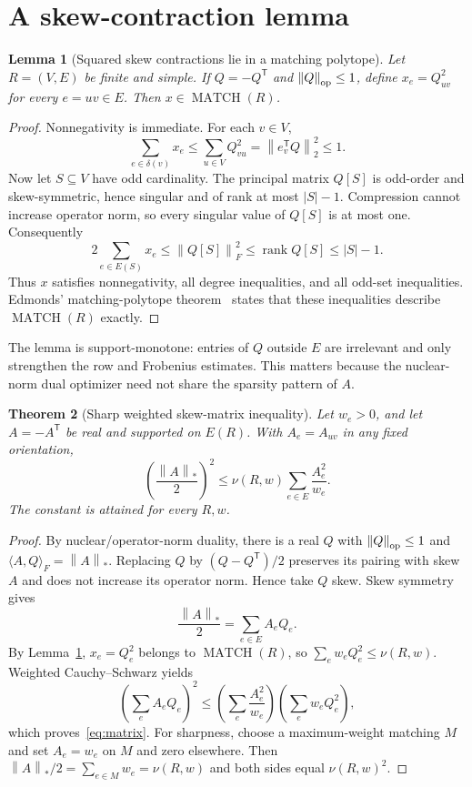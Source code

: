 \documentclass[11pt,a4paper]{article}
\newtheorem{theorem}{Theorem}[section]
\newtheorem{lemma}[theorem]{Lemma}
\theoremstyle{remark}
\newcommand{\norm}[1]{\left\lVert#1\right\rVert}
\newcommand{\MATCH}{\operatorname{MATCH}}
\begin{document}
\section{A skew-contraction lemma}

\begin{lemma}[Squared skew contractions lie in a matching polytope]
\label{lem:contraction}
Let $R=(V,E)$ be finite and simple. If $Q=-Q^{\mathsf T}$ and
$\norm{Q}_{\rm op}\leq1$, define $x_e=Q_{uv}^2$ for every $e=uv\in E$.
Then $x\in\MATCH(R)$.
\end{lemma}

\begin{proof}
Nonnegativity is immediate. For each $v\in V$,
\[
 \sum_{e\in\delta(v)}x_e
 \leq\sum_{u\in V}Q_{vu}^2
 =\norm{e_v^{\mathsf T}Q}_2^2\leq1.
\]
Now let $S\subseteq V$ have odd cardinality. The principal matrix $Q[S]$
is odd-order and skew-symmetric, hence singular and of rank at most $|S|-1$.
Compression cannot increase operator norm, so every singular value of $Q[S]$
is at most one. Consequently
\[
 2\sum_{e\in E(S)}x_e
 \leq \norm{Q[S]}_F^2
 \leq \operatorname{rank}Q[S]\leq |S|-1.
\]
Thus $x$ satisfies nonnegativity, all degree inequalities, and all odd-set
inequalities. Edmonds' matching-polytope theorem~\cite{edmonds} states that
these inequalities describe $\MATCH(R)$ exactly.
\end{proof}

The lemma is support-monotone: entries of $Q$ outside $E$ are irrelevant and
only strengthen the row and Frobenius estimates. This matters because the
nuclear-norm dual optimizer need not share the sparsity pattern of $A$.

\begin{theorem}[Sharp weighted skew-matrix inequality]
\label{thm:matrix}
Let $w_e>0$, and let $A=-A^{\mathsf T}$ be real and supported on $E(R)$.
With $A_e=A_{uv}$ in any fixed orientation,
\begin{equation}\label{eq:matrix}
 \left(\frac{\norm{A}_*}{2}\right)^2
 \leq \nu(R,w)\sum_{e\in E}\frac{A_e^2}{w_e}.
\end{equation}
The constant is attained for every $R,w$.
\end{theorem}

\begin{proof}
By nuclear/operator-norm duality, there is a real $Q$ with
$\norm{Q}_{\rm op}\leq1$ and
$\langle A,Q\rangle_F=\norm{A}_*$. Replacing $Q$ by
$(Q-Q^{\mathsf T})/2$ preserves its pairing with skew $A$ and does not
increase its operator norm. Hence take $Q$ skew. Skew symmetry gives
\[
 \frac{\norm{A}_*}{2}=\sum_{e\in E}A_eQ_e.
\]
By Lemma~\ref{lem:contraction}, $x_e=Q_e^2$ belongs to $\MATCH(R)$, so
$\sum_e w_eQ_e^2\leq\nu(R,w)$. Weighted Cauchy--Schwarz yields
\[
 \left(\sum_e A_eQ_e\right)^2
 \leq\left(\sum_e\frac{A_e^2}{w_e}\right)
       \left(\sum_e w_eQ_e^2\right),
\]
which proves~\eqref{eq:matrix}. For sharpness, choose a maximum-weight
matching $M$ and set $A_e=w_e$ on $M$ and zero elsewhere. Then
$\norm{A}_*/2=\sum_{e\in M}w_e=\nu(R,w)$ and both sides equal
$\nu(R,w)^2$.
\end{proof}
\end{document}
